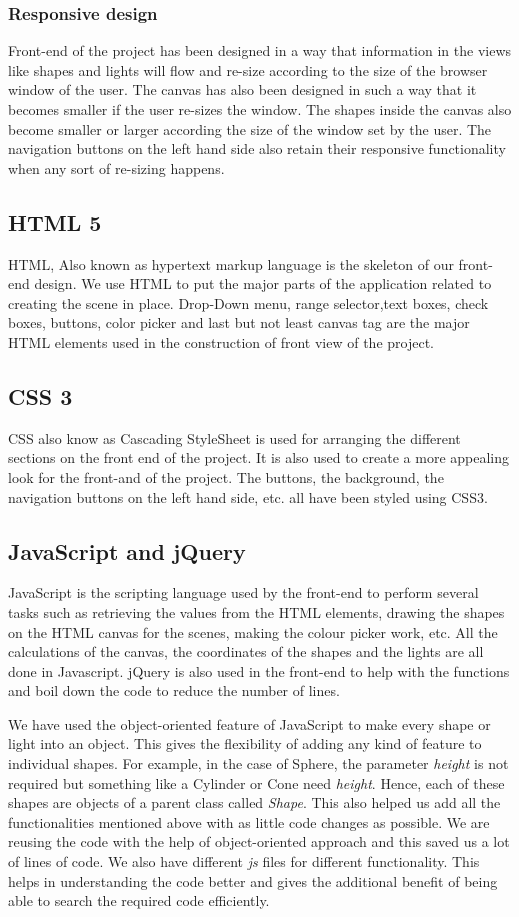 \documentclass[10pt]{scrartcl}
\begin{document}
\subsubsection{Responsive design}
Front-end of the project has been designed in a way that information in the views like shapes and lights will flow and re-size according to the size of the browser window of the user. The canvas has also been designed in such a way that it becomes smaller if the user re-sizes the window. The shapes inside the canvas also become smaller or larger according the size of the window set by the user. The navigation buttons on the left hand side also retain their responsive functionality when any sort of re-sizing happens.
\subsection{HTML 5}
HTML, Also known as hypertext markup language is the skeleton of our front-end design. We use HTML to put the major parts of the application related to creating the scene in place. Drop-Down menu, range selector,text boxes, check boxes, buttons, color picker and last but not least canvas tag are the major HTML elements used in the construction of front view of the project.

\subsection{CSS 3}
CSS also know as Cascading StyleSheet is used for arranging the different sections on the front end of the project. It is also used to create a more appealing look for the front-and of the project. The buttons, the background, the navigation buttons on the left hand side, etc. all have been styled using CSS3.

\subsection{JavaScript and jQuery}
JavaScript is the scripting language used by the front-end to perform several tasks such as retrieving the values from the HTML elements, drawing the shapes on the HTML canvas for the scenes, making the colour picker work, etc. All the calculations of the canvas, the coordinates of the shapes and the lights are all done in Javascript. jQuery is also used in the front-end to help with the functions and boil down the code to reduce the number of lines. \par
We have used the object-oriented feature of JavaScript to make every shape or light into an object. This gives the flexibility of adding any kind of feature to individual shapes. For example, in the case of Sphere, the parameter \textit{height} is not required but something like a Cylinder or Cone need \textit{height}. Hence, each of these shapes are objects of a parent class called \textit{Shape}. This also helped us add all the functionalities mentioned above with as little code changes as possible. We are reusing the code with the help of object-oriented approach and this saved us a lot of lines of code. We also have different \textit{js} files for different functionality. This helps in understanding the code better and gives the additional benefit of being able to search the required code efficiently.
\end{document}
